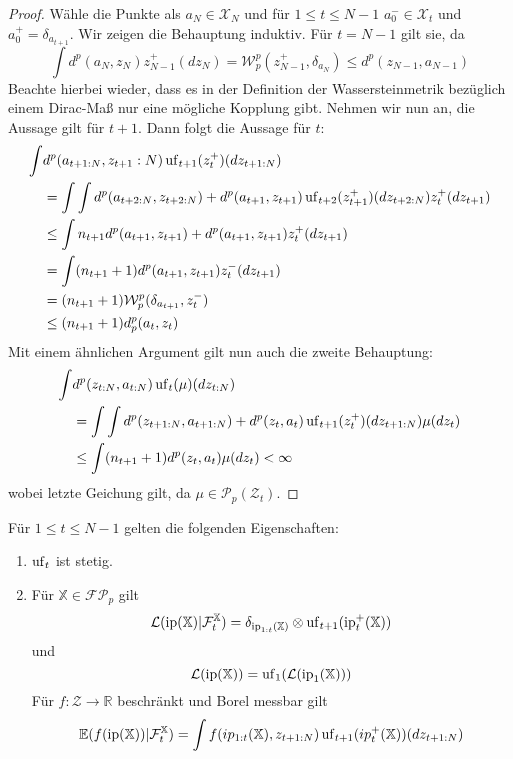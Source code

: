 \begin{proof}
Wähle die Punkte als $a_N \in \mathcal{X}_N$ und für $1\leq t \leq N-1$ $a_0^-\in\mathcal{X}_t$ und $a_0^+ = \delta_{a_{t+1}}$. 
Wir zeigen die Behauptung induktiv. Für $t=N-1$ gilt sie, da
$$\int d^p(a_N, z_N)z_{N-1}^+(dz_N)=\mathcal{W}_p^p(z_{N-1}^+, \delta_{a_N}) \leq d^p(z_{N-1}, a_{N-1})$$
Beachte hierbei wieder, dass es in der Definition der Wassersteinmetrik bezüglich einem Dirac-Maß nur eine mögliche Kopplung gibt. Nehmen wir nun an, die Aussage gilt für $t+1$. Dann folgt die Aussage für $t$:
\begin{align*}
\int &d^p(a_{t+1:N}, z_{t+1}:N) \operatorname{uf}_{t+1}(z_t^+)(dz_{t+1:N}) \\
&= \int\int d^p(a_{t+2:N}, z_{t+2:N}) + d^p(a_{t+1}, z_{t+1}) \operatorname{uf}_{t+2}(z_{t+1}^+)(dz_{t+2:N})z_t^+(dz_{t+1}) \\
&\leq \int n_{t+1}d^p(a_{t+1}, z_{t+1}) + d^p(a_{t+1}, z_{t+1}) z_t^+(dz_{t+1}) \\
&= \int (n_{t+1}+1)d^p(a_{t+1}, z_{t+1}) z_t^-(dz_{t+1}) \\
&= (n_{t+1}+1)\mathcal{W}_p^p(\delta_{a_{t+1}}, z_t^-) \\
&\leq (n_{t+1}+1)d_p^p(a_t, z_t)
\end{align*}
Mit einem ähnlichen Argument gilt nun auch die zweite Behauptung:
\begin{align*}
\int &d^p(z_{t:N}, a_{t:N})\operatorname{uf}_{t}(\mu)(dz_{t:N}) \\
&= \int\int d^p(z_{t+1:N}, a_{t+1:N})+d^p(z_t, a_t)\operatorname{uf}_{t+1}(z_t^+)(dz_{t+1:N})\mu(dz_t) \\
&\leq \int (n_{t+1}+1)d^p(z_t, a_t)\mu(dz_t) < \infty
\end{align*}
wobei letzte Geichung gilt, da $\mu \in\mathcal{P}_p(\mathcal{Z}_t)$.
\end{proof}
\begin{lemma}\label{thm:properties_unfold}
Für $1\leq t\leq N-1$ gelten die folgenden Eigenschaften:
\begin{enumerate}
\item $\operatorname{uf}_t$ ist stetig.
\item Für $\mathbb{X}\in\mathcal{FP}_p$ gilt
\begin{align}
    \mathcal{L}(\operatorname{ip}(\mathbb{X})\vert \mathcal{F}_t^\mathbb{X})=\delta_{\operatorname{ip}_{1:t}(\mathbb{X})}\otimes \operatorname{uf}_{t+1}(\operatorname{ip}_t^+(\mathbb{X}))
\end{align}
und 
$$\mathcal{L}(\operatorname{ip}(\mathbb{X}))=\operatorname{uf}_1(\mathcal{L}(\operatorname{ip}_1(\mathbb{X})))$$
Für $f:\mathcal{Z}\rightarrow \mathbb{R}$ beschränkt und Borel messbar gilt
\begin{align}\label{eq:uf_expected_value}
    \mathbb{E}(f(\operatorname{ip}(\mathbb{X}))\vert \mathcal{F}_t^\mathbb{X}) = \int f(ip_{1:t}(\mathbb{X}), z_{t+1:N}) \operatorname{uf}_{t+1}(ip_{t}^+(\mathbb{X}))(dz_{t+1:N})
\end{align}
\end{enumerate}
\end{lemma}

